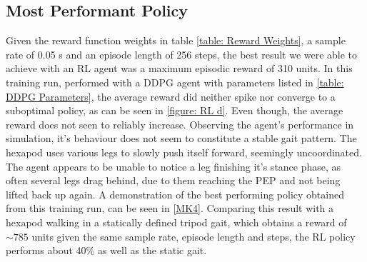 \subsection{Most Performant Policy}
Given the reward function weights in table \ref{table: Reward Weights}, a sample rate of 0.05 s and an episode length of 256 steps, the best result we were able to achieve with an RL agent was a maximum episodic reward of 310 units.
In this training run, performed with a DDPG agent with parameters listed in \ref{table: DDPG Parameters}, the average reward did neither spike nor converge to a suboptimal policy, as can be seen in \ref{figure: RL d}.
Even though, the average reward does not seen to reliably increase.
Observing the agent's performance in simulation, it's behaviour does not seem to constitute a stable gait pattern.
The hexapod uses various legs to slowly push itself forward, seemingly uncoordinated.
The agent appears to be unable to notice a leg finishing it's stance phase, as often several legs drag behind, due to them reaching the PEP and not being lifted back up again.
A demonstration of the best performing policy obtained from this training run, can be seen in [\hyperref[vid: MK4]{MK4}].
Comparing this result with a hexapod walking in a statically defined tripod gait, which obtains a reward of $\sim785$ units given the same sample rate, episode length and steps, the RL policy performs about 40\% as well as the static gait.


